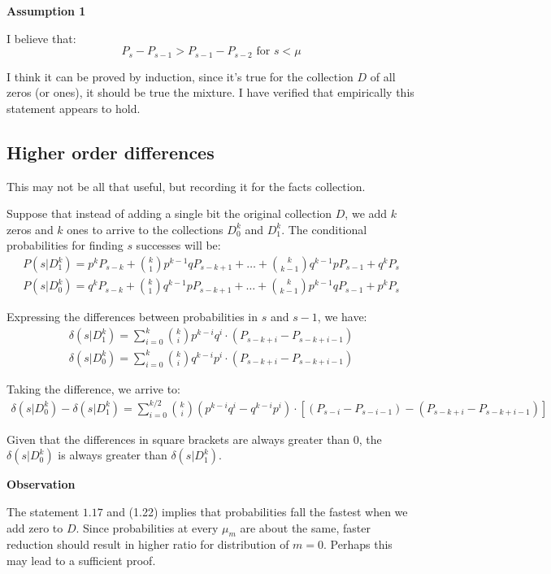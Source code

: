\documentclass[11pt,draft]{article}
\begin{document}
\textbf{Assumption 1}

I believe that:
\[ P_s - P_{s-1} > P_{s-1}-P_{s-2}  \text{ for } s < \mu \]

I think it can be proved by induction, since it's true for the collection $D$ of all zeros (or ones), it should be true the mixture. I have verified that empirically this statement appears to hold.

\subsection{Higher order differences}

This may not be all that useful, but recording it for the facts collection.

Suppose that instead of adding a single bit the original collection $D$,  we add $k$ zeros and $k$ ones to arrive to the collections $D^k_0$ and $D^k_1$.  The conditional probabilities for finding $s$ successes will be:
 \begin{align}
P(s | D^k_1) = p^k P_{s-k} + \binom{k}{1}p^{k-1}qP_{s-k+1} + \dots + \binom{k}{k-1}q^{k-1}pP_{s-1} + q^kP_s \\
P(s | D^k_0) = q^k P_{s-k} + \binom{k}{1}q^{k-1}pP_{s-k+1} + \dots + \binom{k}{k-1}p^{k-1}qP_{s-1} + p^kP_s
\end{align}

Expressing the differences between probabilities in $s$ and $s-1$, we have:
 \begin{align}
 \delta(s|D^k_1) = \sum^{k}_{i=0} \binom{k}{i}p^{k-i}q^i \cdot (P_{s-k+i}  - P_{s-k+i-1})\\
 \delta(s|D^k_0) = \sum^{k}_{i=0} \binom{k}{i}q^{k-i}p^i \cdot (P_{s-k+i}  - P_{s-k+i-1})
\end{align}

Taking the difference, we arrive to:
 \begin{align}
  \delta(s|D^k_0) - \delta(s|D^k_1) = \sum^{k/2}_{i=0} \binom{k}{i}(p^{k-i}q^i - q^{k-i}p^i) \cdot [ (P_{s-i} - P_{s-i-1})  - (P_{s-k+i} - P_{s-k+i-1}) ]
\end{align}

Given that the differences in square brackets are always greater than 0, the $\delta(s|D^k_0)$  is always greater than $ \delta(s|D^k_1)$.

\textbf{Observation}

The statement $1.17$ and (1.22) implies that probabilities fall the fastest when we add zero to $D$.  Since probabilities at every $\mu_m$ are about the same, faster reduction should result in higher ratio for distribution of $m=0$.   
Perhaps this may lead to a sufficient proof.
 
\end{document}
